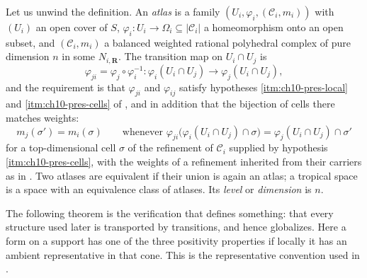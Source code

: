 Let us unwind the definition.  An \emph{atlas} is a family
$(U_i,\varphi_i,(\mathscr C_i,m_i))$ with $(U_i)$ an open cover of $S$,
$\varphi_i:U_i\to\Omega_i\subseteq|\mathscr C_i|$ a homeomorphism onto an
open subset, and $(\mathscr C_i,m_i)$ a balanced weighted rational
polyhedral complex of pure dimension $n$ in some $N_{i,\mathbf R}$.  The
transition map on $U_i\cap U_j$ is
\[
 \varphi_{ji}
 =\varphi_j\circ\varphi_i^{-1}:
 \varphi_i(U_i\cap U_j)\longrightarrow\varphi_j(U_i\cap U_j),
\]
and the requirement is that $\varphi_{ji}$ and $\varphi_{ij}$ satisfy
hypotheses \cref{itm:ch10-pres-local} and \cref{itm:ch10-pres-cells} of
, and in addition that the
bijection of cells there matches weights:
\begin{equation}
\label{eq:ch10-transition-weights}
 m_j(\sigma')=m_i(\sigma)
 \qquad\text{whenever }
 \varphi_{ji}\bigl(\varphi_i(U_i\cap U_j)\cap\sigma\bigr)
 =\varphi_j(U_i\cap U_j)\cap\sigma'
\end{equation}
for a top-dimensional cell $\sigma$ of the refinement of $\mathscr C_i$
supplied by hypothesis \cref{itm:ch10-pres-cells}, with the weights of a
refinement inherited from their carriers as in
.  Two atlases are equivalent if their
union is again an atlas; a tropical space is a space with an equivalence
class of atlases.  Its \emph{level} or \emph{dimension} is $n$.

The following theorem is the verification that
 defines something: that every structure used
later is transported by transitions, and hence globalizes.
Here a form on a support has one of the three positivity properties if
locally it has an ambient representative in that cone. This is the
representative convention used in .

